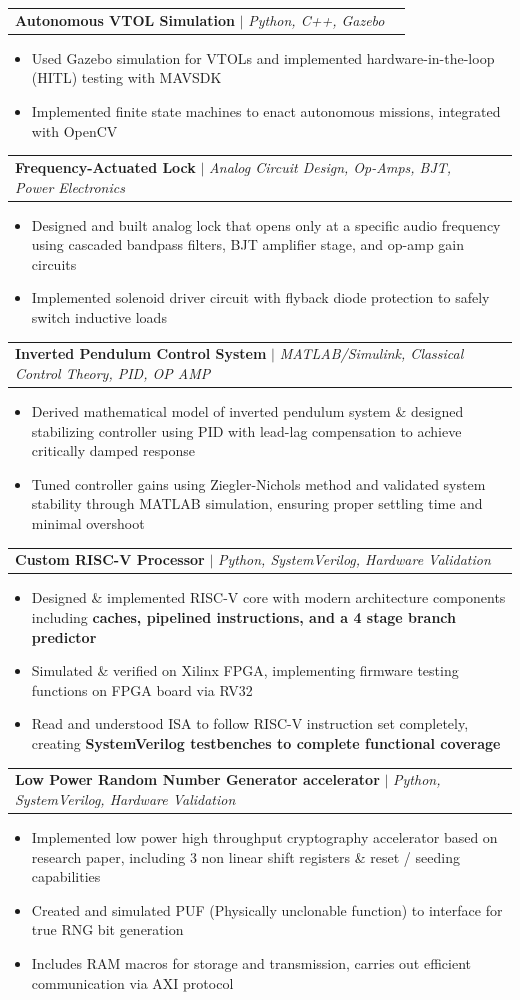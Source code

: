 \documentclass[letterpaper,11pt]{article}
\makeatletter
\newcommand{\resumeItem}[1]{
  \item\small{
    {#1 \vspace{-2pt}}
  }
}
\newcommand{\resumeProjectHeading}[2]{
    \item
    \begin{tabular*}{0.97\textwidth}{l@{\extracolsep{\fill}}r}
      \small#1 & #2 \\
    \end{tabular*}\vspace{-7pt}
}
\newcommand{\resumeItemListStart}{\begin{itemize}}
\newcommand{\resumeItemListEnd}{\end{itemize}\vspace{-5pt}}
\makeatother
\begin{document}
          \resumeProjectHeading
          {\textbf{Autonomous VTOL Simulation} $|$ \emph{Python, C++, Gazebo}}{}
          \resumeItemListStart
            \resumeItem{Used Gazebo simulation for VTOLs and implemented hardware-in-the-loop (HITL) testing with MAVSDK}
            \resumeItem{Implemented finite state machines to enact autonomous missions, integrated with OpenCV}
          \resumeItemListEnd

          \resumeProjectHeading
          {\textbf{Frequency-Actuated Lock} $|$ \emph{Analog Circuit Design, Op-Amps, BJT, Power Electronics}}{}
          \resumeItemListStart
            \resumeItem{Designed and built analog lock that opens only at a specific audio frequency using cascaded bandpass filters, BJT amplifier stage, and op-amp gain circuits}
            \resumeItem{Implemented solenoid driver circuit with flyback diode protection to safely switch inductive loads}
          \resumeItemListEnd
          
        \resumeProjectHeading
          {\textbf{Inverted Pendulum Control System} $|$ \emph{MATLAB/Simulink, Classical Control Theory, PID, OP AMP}}{}
          \resumeItemListStart
            \resumeItem{Derived mathematical model of inverted pendulum system \& designed stabilizing controller using PID with lead-lag compensation to achieve critically damped response}
            \resumeItem{Tuned controller gains using Ziegler-Nichols method and validated system stability through MATLAB simulation, ensuring proper settling time and minimal overshoot}
          \resumeItemListEnd

        \resumeProjectHeading
          {\textbf{Custom RISC-V Processor} $|$ \emph{Python, SystemVerilog, Hardware Validation}}{}
          \resumeItemListStart
            \resumeItem{Designed \& implemented RISC-V core with modern architecture components including \textbf{caches, pipelined instructions, and a 4 stage branch predictor}}
            \resumeItem{Simulated \& verified on Xilinx FPGA, implementing firmware testing functions on FPGA board via RV32}
            \resumeItem{Read and understood ISA to follow RISC-V instruction set completely, creating \textbf{SystemVerilog testbenches to complete functional coverage} }
          \resumeItemListEnd
          
    \resumeProjectHeading
          {\textbf{Low Power Random Number Generator accelerator} $|$ \emph{Python, SystemVerilog, Hardware Validation}}{}
          \resumeItemListStart
            \resumeItem{Implemented low power high throughput cryptography accelerator based on research paper, including 3 non linear shift registers \& reset / seeding capabilities}
            \resumeItem{Created and simulated PUF (Physically unclonable function) to interface for true RNG bit generation}
            \resumeItem{Includes RAM macros for storage and transmission, carries out efficient communication via AXI protocol}
          \resumeItemListEnd
          
\end{document}
